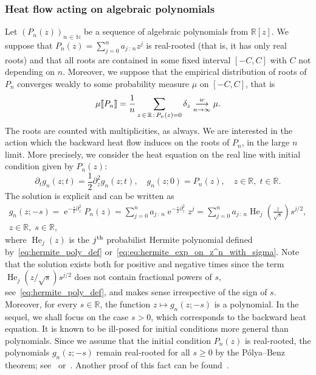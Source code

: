 \documentclass[10pt]{amsart}
\theoremstyle{definition}\newtheorem{defi}[theo]{Definition}\newtheorem{rema}[theo]{Remark}\newtheorem{exam}[theo]{Example}\newtheorem{exem}[theo]{Example}\newtheorem{nota}[theo]{Notation}
\newcommand{\llbracket}{\mathopen{[\mkern -2.7mu[}}
\newcommand{\rrbracket}{\mathclose{]\mkern -2.7mu]}}
\newcommand{\lsem}{\llbracket}
\newcommand{\rsem}{\rrbracket}
\DeclareMathOperator*{\He}{He}
\DeclareMathOperator{\eee}{e}
\newcommand{\R}{\mathbb{R}}
\newcommand{\N}{\mathbb{N}}
\newcommand{\toweak}{\overset{w}{\underset{n\to\infty}\longrightarrow}}
\begin{document}
\subsubsection{Heat flow acting on algebraic polynomials} Let $(P_n(z))_{n\,\in\,\N}$ be a sequence of algebraic polynomials from $\R[z]$. We suppose that $P_n(z) = \sum_{j=0}^n a_{j\,:\,n}z^j$ is real-rooted (that is, it has only real roots) and that all roots are contained in some fixed interval $[-C,C]$ with $C$ not depending on $n$. Moreover, we suppose that the empirical distribution of roots of $P_n$ converges weakly to some probability measure $\mu$ on $[-C,C]$, that is
\begin{equation}\label{eq:empirical_distr_zeroes_conv_algebraic}
\mu\lsem P_n \rsem = \frac 1n \sum_{\substack{z\,\in\,\R\,:\, P_n(z) = 0}} \delta_z \toweak \mu.
\end{equation}
The roots are counted with multiplicities, as always. We are interested in the action which the backward heat flow induces on the roots of $P_n$, in the large $n$ limit. More precisely, we consider the heat equation on the real line with initial condition given by $P_n(z)$:
\begin{equation}\label{eq:heat_equation_algebraic}
\partial_t g_{n}(z; t) = \frac 12 \partial^2_z g_{n}(z;t),
\quad g_n(z; 0) = P_{n}(z),
\quad z\in\R,\; t\in \R.
\end{equation}
The solution is explicit and can be written as
\begin{multline}\label{eq:heat_eq_solution_alg}
g_{n} (z; -s) =
\eee^{-\frac s2 \partial_z^2} P_{n}(z) =
\sum_{j=0}^n a_{j\,:\,n} \eee^{-\frac s2 \partial_z^2} z^j =
\sum_{j=0}^n a_{j\,:\,n} \He\nolimits_j\left(\frac{z}{\sqrt s}\right) s^{j/2},
\\
z\in \R, \; s\in \R,
\end{multline}
where $\He_j(z)$ is the $j^{\text{\normalfont th}}$ probabilist Hermite polynomial defined by~\eqref{eq:hermite_poly_def} or~\eqref{eq:eq:hermite_exp_on_z^n_with_sigma}. Note that the solution exists both for positive and negative times since the term $\He_j(z/\sqrt s) s^{j/2}$ does not contain fractional powers of $s$, see~\eqref{eq:hermite_poly_def}, and makes sense irrespective of the sign of $s$. Moreover, for every $s\in \R$, the function $z\mapsto g_n(z; -s)$ is a polynomial. In the sequel, we shall focus on the case $s>0$, which corresponds to the backward heat equation. It is known to be ill-posed for initial conditions more general than polynomials. Since we assume that the initial condition $P_n(z)$ is real-rooted, the polynomials $g_n(z; -s)$ remain real-rooted for all $s\geq 0$ by the Pólya--Benz theorem; see~\cite{benz} or~\cite[Theorem~1.2]{aleman_beliaev_hedenmalm}. Another proof of this fact can be found~\cite{tao_blog1}.
\end{document}
